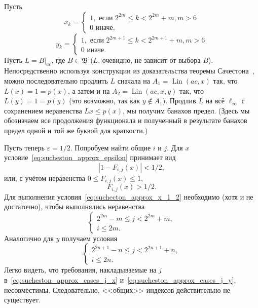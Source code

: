 \begin{example}
	Пусть
	\begin{equation}
		x_k = \begin{cases}
			1, \mbox{~если~} 2^{2m} \leq k < 2^{2m} + m, m > 6
			\\
			0 \mbox{~иначе,~}
		\end{cases}
	\end{equation}
	\begin{equation}
		y_k = \begin{cases}
			1, \mbox{~если~} 2^{2m+1} \leq k < 2^{2m+1} + m, m > 6
			\\
			0 \mbox{~иначе.}
		\end{cases}
	\end{equation}
	Пусть $L = B|_{ac}$, где $B\in\mathfrak{B}$ ($L$, очевидно, не зависит от выбора $B$).
	Непосредственно используя конструкции из доказательства теоремы Сачестона~\cite{sucheston1967banach},
	можно последовательно продлить $L$ сначала на $A_1 = \operatorname{Lin}(ac, x)$
	так, что $L(x) = 1 = p(x)$,
	а затем и на $A_2 = \operatorname{Lin}(ac, x,y)$
	так, что $L(y) = 1 = p(y)$
	(это возможно, так как $y\notin A_1$).
	Продлив $L$ на всё $\ell_\infty$ с сохранением неравенства $Lx\leq p(x)$,
	мы получим банахов предел.
	(Здесь мы обозначаем все продолжения функционала и полученный в результате банахов предел одной и той же буквой
	для краткости.)

	Пусть теперь $\varepsilon = 1/2$.
	Попробуем найти общие $i$ и $j$.
	Для $x$ условие~\eqref{eq:sucheston_approx_epsilon} принимает вид
	\begin{equation}
		|1 - F_{i,j}(x)| < 1/2
		,
	\end{equation}
	или, с учётом неравенства $0 \leq F_{i,j}(x) \leq 1$,
	\begin{equation}
		\label{eq:suchecton_approx_x_1_2}
		F_{i,j}(x) > 1/2
		.
	\end{equation}
	Для выполнения условия~\eqref{eq:suchecton_approx_x_1_2} необходимо (хотя и не достаточно),
	чтобы выполнялись неравенства
	\begin{equation}
		\label{eq:sucheston_approx_cases_j_x}
		\begin{cases}
			 2^{2m} - m \leq j < 2^{2m} + m,
			 \\
			 i \leq 2m
			 .
		\end{cases}
	\end{equation}
	Аналогично для $y$ получаем условия
	\begin{equation}
		\label{eq:sucheston_approx_cases_j_y}
		\begin{cases}
			 2^{2n+1} - n \leq j < 2^{2n+1} + n,
			 \\
			 i \leq 2n
			 .
		\end{cases}
	\end{equation}
	Легко видеть, что требования, накладываемые на $j$ в~\eqref{eq:sucheston_approx_cases_j_x} и~\eqref{eq:sucheston_approx_cases_j_y},
	несовместимы.
	Следовательно, <<общих>> индексов действительно не существует.
\end{example}
